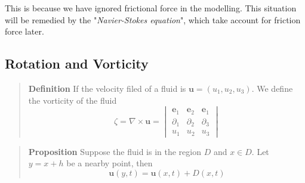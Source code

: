 This is because we have ignored frictional force in the modelling. This situation will be remedied by the "\textit{Navier-Stokes equation}", which take account for friction force later.

\subsection{Rotation and Vorticity} %

\begin{quote}
	\textbf{Definition}
If the velocity filed of a fluid is $\textbf{u}=(u_1,u_2,u_3)$. We define the vorticity of the fluid
\begin{equation}
\zeta = \nabla \times \textbf{u}
= \begin{vmatrix}
\textbf{e}_1 & \textbf{e}_2 & \textbf{e}_1\\
\partial_{1} & \partial_{2} & \partial_{3}\\
u_1 & u_2 & u_3
\end{vmatrix}
\end{equation}

\end{quote}
\begin{quote}
	\textbf{Proposition}
Suppose the fluid is in the region $D$ and $x\in D$. Let $y = x + h$ be a nearby point, then
\begin{equation}
\textbf{u}(y,t) = \textbf{u}(x,t) + D(x,t)
\end{equation}

\end{quote}
